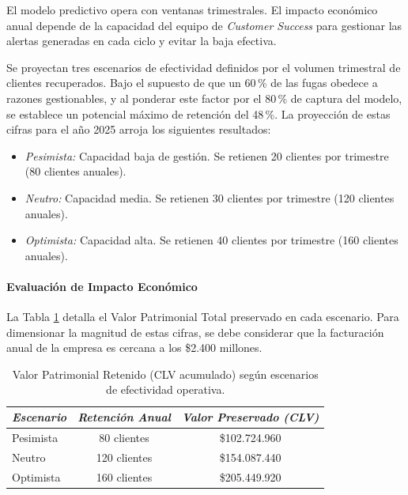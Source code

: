 El modelo predictivo opera con ventanas trimestrales. El impacto económico anual depende de la capacidad del equipo de \textit{Customer Success} para gestionar las alertas generadas en cada ciclo y evitar la baja efectiva.

Se proyectan tres escenarios de efectividad definidos por el volumen trimestral de clientes recuperados. Bajo el supuesto de que un 60\,\% de las fugas obedece a razones gestionables, y al ponderar este factor por el 80\,\% de captura del modelo, se establece un potencial máximo de retención del 48\,\%. La proyección de estas cifras para el año 2025 arroja los siguientes resultados:

\begin{itemize}
    \item \textit{Pesimista:} Capacidad baja de gestión. Se retienen 20 clientes por trimestre (80 clientes anuales).
    \item \textit{Neutro:} Capacidad media. Se retienen 30 clientes por trimestre (120 clientes anuales).
    \item \textit{Optimista:} Capacidad alta. Se retienen 40 clientes por trimestre (160 clientes anuales).
\end{itemize}

\paragraph{Evaluación de Impacto Económico}

La Tabla \ref{tab:escenarios_clv} detalla el Valor Patrimonial Total preservado en cada escenario. Para dimensionar la magnitud de estas cifras, se debe considerar que la facturación anual de la empresa es cercana a los \$2.400 millones.

\begin{table}[H]
    \centering
    \caption{Valor Patrimonial Retenido (CLV acumulado) según escenarios de efectividad operativa.}
    \label{tab:escenarios_clv}
    \small
    \begin{tabular}{|l|c|c|}
    \hline
    \textit{Escenario} & \textit{Retención Anual} & \textit{Valor Preservado (CLV)} \\ \hline
    Pesimista          & 80 clientes              & \$102.724.960                   \\ \hline
    Neutro             & 120 clientes             & \$154.087.440                   \\ \hline
    Optimista          & 160 clientes             & \$205.449.920                   \\ \hline
    \end{tabular}
\end{table}

